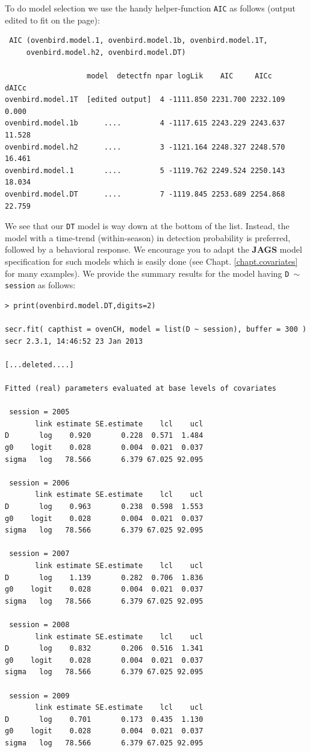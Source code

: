 To do model selection  we use the handy helper-function \mbox{\tt AIC}
as follows (output edited to fit on the page):
{\small
\begin{verbatim}
 AIC (ovenbird.model.1, ovenbird.model.1b, ovenbird.model.1T,
     ovenbird.model.h2, ovenbird.model.DT)

                   model  detectfn npar logLik    AIC     AICc     dAICc 
ovenbird.model.1T  [edited output]  4 -1111.850 2231.700 2232.109  0.000
ovenbird.model.1b      ....         4 -1117.615 2243.229 2243.637 11.528
ovenbird.model.h2      ....         3 -1121.164 2248.327 2248.570 16.461
ovenbird.model.1       ....         5 -1119.762 2249.524 2250.143 18.034
ovenbird.model.DT      ....         7 -1119.845 2253.689 2254.868 22.759
\end{verbatim}
}
We see that our \mbox{\tt DT} model is way down at the bottom of the list.
Instead, 
the model with a time-trend (within-season) in detection probability
is preferred, followed by a behavioral response. We encourage you to
adapt the {\bf JAGS} model specification for such models which is easily
done (see Chapt. \ref{chapt.covariates} for many examples).
We provide the summary results for the model having \mbox{\tt D $\sim$
  session} as follows:
{\small
\begin{verbatim}
> print(ovenbird.model.DT,digits=2)

secr.fit( capthist = ovenCH, model = list(D ~ session), buffer = 300 )
secr 2.3.1, 14:46:52 23 Jan 2013

[...deleted....]

Fitted (real) parameters evaluated at base levels of covariates 

 session = 2005 
       link estimate SE.estimate    lcl    ucl
D       log    0.920       0.228  0.571  1.484
g0    logit    0.028       0.004  0.021  0.037
sigma   log   78.566       6.379 67.025 92.095

 session = 2006 
       link estimate SE.estimate    lcl    ucl
D       log    0.963       0.238  0.598  1.553
g0    logit    0.028       0.004  0.021  0.037
sigma   log   78.566       6.379 67.025 92.095

 session = 2007 
       link estimate SE.estimate    lcl    ucl
D       log    1.139       0.282  0.706  1.836
g0    logit    0.028       0.004  0.021  0.037
sigma   log   78.566       6.379 67.025 92.095

 session = 2008 
       link estimate SE.estimate    lcl    ucl
D       log    0.832       0.206  0.516  1.341
g0    logit    0.028       0.004  0.021  0.037
sigma   log   78.566       6.379 67.025 92.095

 session = 2009 
       link estimate SE.estimate    lcl    ucl
D       log    0.701       0.173  0.435  1.130
g0    logit    0.028       0.004  0.021  0.037
sigma   log   78.566       6.379 67.025 92.095
\end{verbatim}
}

